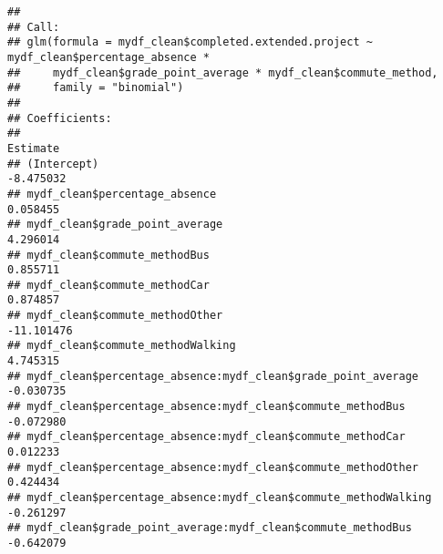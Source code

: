 \documentclass[
]{article}
\newenvironment{Shaded}{\begin{snugshade}}{\end{snugshade}}
\newcommand{\AttributeTok}[1]{\textcolor[rgb]{0.13,0.29,0.53}{#1}}
\newcommand{\FunctionTok}[1]{\textcolor[rgb]{0.13,0.29,0.53}{\textbf{#1}}}
\newcommand{\NormalTok}[1]{#1}
\newcommand{\OtherTok}[1]{\textcolor[rgb]{0.56,0.35,0.01}{#1}}
\newcommand{\SpecialCharTok}[1]{\textcolor[rgb]{0.81,0.36,0.00}{\textbf{#1}}}
\newcommand{\StringTok}[1]{\textcolor[rgb]{0.31,0.60,0.02}{#1}}
\begin{document}
\begin{Shaded}
\end{Shaded}

\begin{verbatim}
## 
## Call:
## glm(formula = mydf_clean$completed.extended.project ~ mydf_clean$percentage_absence * 
##     mydf_clean$grade_point_average * mydf_clean$commute_method, 
##     family = "binomial")
## 
## Coefficients:
##                                                                                                 Estimate
## (Intercept)                                                                                    -8.475032
## mydf_clean$percentage_absence                                                                   0.058455
## mydf_clean$grade_point_average                                                                  4.296014
## mydf_clean$commute_methodBus                                                                    0.855711
## mydf_clean$commute_methodCar                                                                    0.874857
## mydf_clean$commute_methodOther                                                                -11.101476
## mydf_clean$commute_methodWalking                                                                4.745315
## mydf_clean$percentage_absence:mydf_clean$grade_point_average                                   -0.030735
## mydf_clean$percentage_absence:mydf_clean$commute_methodBus                                     -0.072980
## mydf_clean$percentage_absence:mydf_clean$commute_methodCar                                      0.012233
## mydf_clean$percentage_absence:mydf_clean$commute_methodOther                                    0.424434
## mydf_clean$percentage_absence:mydf_clean$commute_methodWalking                                 -0.261297
## mydf_clean$grade_point_average:mydf_clean$commute_methodBus                                    -0.642079

\end{verbatim}
\end{document}
